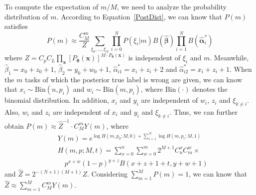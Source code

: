 \documentclass{article}
\begin{document}
To compute the expectation of $m/M$, we need to analyze the probability distribution of $m$. According to Equation~\ref{PostDist}, we can know that $P(m)$ satisfies
\begin{equation}
P(m) \approx \frac{C_{M}^{m}}{Z} \sum_{\xi_0,\ldots, \xi_N}\prod_{i=0}^{N}P(\xi_i|m) B(\hat{\bm{\beta}})\prod_{i=1}^{N}B(\hat{\bm{\alpha}}^{*}_{i})
\end{equation}
where $Z=C_pC_L{\prod}_{\bm{x}} [P_{\bm{\theta}}(\bm{x})]^{M\cdot P_{\bm{\theta}}(\bm{x})}$ is independent of $\xi_i$ and $m$.
Meanwhile, $\hat{\beta}_1=x_0+z_0+1$, $\hat{\beta}_2=y_0+w_0+1$, $\hat{\alpha}_{i1}^{*}=x_i+z_i+2$ and $\hat{\alpha}_{i2}^{*}=x_i+z_i+1$.
When the $m$ tasks of which the posterior true label is wrong are given, we can know that $x_i\sim \mathrm{Bin}(n, p_i)$ and $w_i\sim \mathrm{Bin}(m, p_i)$, where $\mathrm{Bin}(\cdot)$ denotes the binomial distribution.
In addition, $x_i$ and $y_i$ are independent of $w_i$, $z_i$ and $\xi_{k\neq i}$.
Also, $w_i$ and $z_i$ are independent of $x_i$ and $y_i$ and $\xi_{k\neq i}$.
Thus, we can further obtain $P(m)\approx \hat{Z}^{-1}\cdot C_{M}^{m}Y(m)$, where
\begin{equation}
\label{PDist}
\begin{split}
&Y(m) =e^{\log H(m,p_0;M,0)+\sum_{i=1}^{N}\log H(m,p_i;M,1)}\\
&H(m,p;M,t)={\sum}_{x=0}^{n}{\sum}_{w=0}^{m} 2^{M+1}C_{n}^{x}C_{m}^{w}\times\\
&\quad p^{x+w}(1-p)^{y+z}B(x+z+1+t,y+w+1)
\end{split}
\end{equation}
and $\hat{Z}=2^{-(N+1)(M+1)}Z$.
Considering $\sum_{m=1}^{M} P(m)=1$, we can know that $\hat{Z}\approx{\sum}_{m=1}^{M}C_{M}^{m}Y(m)$.
\end{document}
